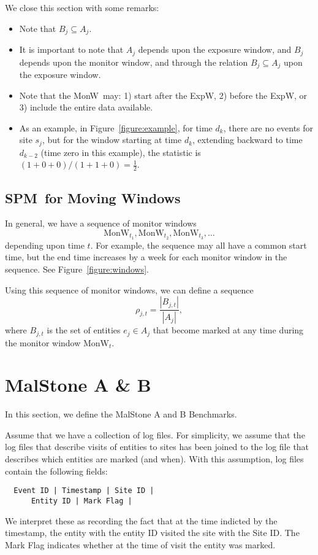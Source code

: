 \documentclass{acm_proc_article-sp}
\def\spm{\mbox{SPM}}
\def\expwindow{\mbox{ExpW}}
\def\monwindow{\mbox{MonW}}
\def\malstone{MalStone } \def\malgen{MalGen }
\begin{document}
We close this section with some remarks:
\begin{itemize}

\item Note that $B_j \subseteq A_j$.

\item It is important to note
that $A_j$ depends upon the exposure window, and $B_j$ depends upon the
monitor window, and through the relation $B_j \subseteq A_j$ upon the exposure window.

\item Note that the \monwindow\ may: 1) start after the \expwindow, 2) before
the \expwindow, or 3) include the entire data available.

\item As an example, in Figure~\ref{figure:example}, 
for time $d_k$, there are no events for
site $s_j$, but for the window starting at time $d_k$, extending backward to
time $d_{k-2}$ (time zero in this example), the statistic is 
$(1 + 0 + 0) / (1 + 1 + 0) = \frac{1}{2}$.

\end{itemize}



\subsection{\spm\ for Moving Windows}

In general, we have a sequence of monitor windows  
$$\monwindow_{t_1},  \monwindow_{t_2}, \monwindow_{t_3}, \ldots $$
depending upon time $t$.  For example, the sequence may all have a common
start time, but the end time increases by a week for each monitor window
in the sequence.  See Figure~\ref{figure:windows}.

Using this sequence of monitor windows, we can define a sequence
$$\rho_{j,t} = \frac{ |B_{j,t}| }{| A_j |},  $$
where $B_{j,t}$ is the set of entities $e_j\in A_j$ that become marked
at any time during the monitor window $\monwindow_t$.


\section{\malstone A \& B}
\label{section:benchmark}
In this section, we define the MalStone A and B Benchmarks.

Assume that we have a collection of log files.  For simplicity, we assume
that the log files that describe visits of entities to sites has been joined
to the log file that describes which entities are marked (and when).
With this assumption, log files contain the following fields:
\begin{verbatim}
  Event ID | Timestamp | Site ID | 
      Entity ID | Mark Flag |
\end{verbatim}
We interpret these as recording the fact that at the time indicted by the timestamp,
the entity with the entity ID visited the site with the Site ID.  The Mark Flag indicates
whether at the time of visit the entity was marked.  
\end{document}

